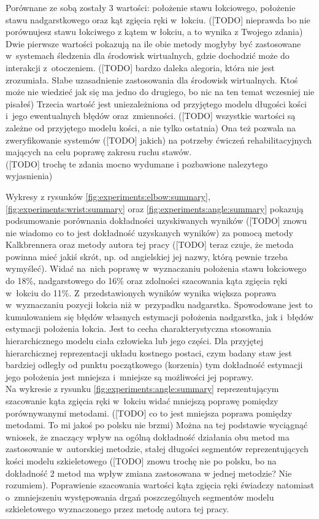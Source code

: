 Porównane ze sobą zostały 3 wartości: położenie stawu łokciowego, położenie stawu nadgarstkowego oraz kąt zgięcia ręki w~łokciu. ([TODO] nieprawda bo nie porównujesz stawu łokciwego z kątem w łokciu, a to wynika z Twojego zdania) Dwie pierwsze wartości pokazują na ile obie metody mogłyby być zastosowane w~systemach śledzenia dla środowisk wirtualnych, gdzie dochodzić może do interakcji z~otoczeniem. ([TODO] bardzo daleka alegoria, która nie jest zrozumiała. Słabe uzasadnienie zastosowania dla środowisk wirtualnych. Ktoś może nie wiedzieć jak się ma jedno do drugiego, bo nic na ten temat wczesniej nie pisałeś) Trzecia wartość jest uniezależniona od przyjętego modelu długości kości i~jego ewentualnych błędów oraz~zmienności. ([TODO] wszystkie wartości są zależne od przyjętego modelu kości, a nie tylko ostatnia) Ona też pozwala na zweryfikowanie systemów ([TODO] jakich) na potrzeby ćwiczeń rehabilitacyjnych mających na celu poprawę zakresu ruchu stawów. \\ ([TODO] trochę te zdania mocno wydumane i pozbawione nalezytego wyjasnienia)

Wykresy z rysunków \ref{fig:experiments:elbow:summary}, \ref{fig:experiments:wrist:summary} oraz \ref{fig:experiments:angle:summary} pokazują podsumowanie porównania dokładności uzyskiwanych wyników ([TODO] znowu nie wiadomo co to jest dokładność uzyskanych wyników) za pomocą metody Kalkbrennera oraz metody autora tej pracy ([TODO] teraz czuje, że metoda powinna mieć jakiś skrót, np. od angielskiej jej nazwy, którą pewnie trzeba wymyśleć). Widać na~nich poprawę w~wyznaczaniu położenia stawu łokciowego do 18\%, nadgarstowego do 16\% oraz zdolności szacowania kąta zgięcia ręki w~łokciu do 11\%. Z~przedstawionych wyników wynika większa poprawa w~wyznaczaniu pozycji łokcia niż w~przypadku nadgarstka. Spowodowane jest to kumulowaniem się błędów własnych estymacji położenia nadgarstka, jak i~błędów estymacji położenia łokcia. Jest to cecha charakterystyczna stosowania hierarchicznego modelu ciała człowieka lub jego części. Dla przyjętej hierarchicznej reprezentacji układu kostnego postaci, czym badany staw jest bardziej odległy od punktu początkowego (korzenia) tym dokładność estymacji jego położenia jest mniejsza i~mniejsze są możliwości jej poprawy.\\

Na wykresie z rysunku \ref{fig:experiments:angle:summary} reprezentującym szacowanie kąta zgięcia ręki w~łokciu widać mniejszą poprawę pomiędzy porównywanymi metodami. ([TODO] co to jest mniejsza poprawa pomiędzy metodami. To mi jakoś po polsku nie brzmi) Można na tej podstawie wyciągnąć wniosek, że znaczący wpływ na ogólną dokładność działania obu metod ma zastosowanie w~autorskiej metodzie, stałej długości segmentów reprezentujących kości modelu szkieletowego ([TODO] znowu trochę nie po polsku, bo na dokładność 2 metod ma wpływ zmiana zastosowana w jednej metodzie? Nie rozumiem). Poprawienie szacowania wartości kąta zgięcia ręki świadczy natomiast o~zmniejszeniu występowania drgań poszczególnych segmentów modelu szkieletowego wyznaczonego przez metodę autora tej pracy.

